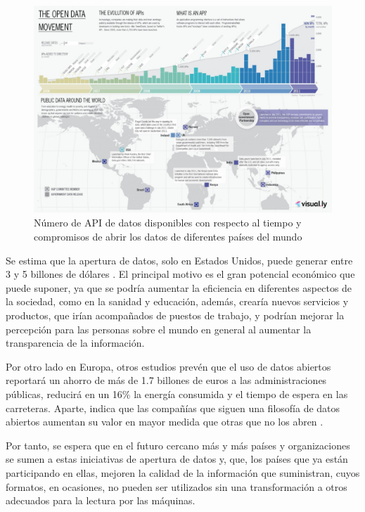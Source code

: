 \begin{figure}[htp!]
	\centering
	\caption{Número de API de datos disponibles con respecto al tiempo y compromisos de abrir los datos de diferentes países del mundo \cite{graphdata}}
	\label{fig:opendata}
	\vspace{10pt}
	\includegraphics[scale=0.3]{graphics/opendata}
\end{figure}



Se estima que la apertura de datos, solo en Estados Unidos, puede generar entre 3 y 5 billones de dólares \cite{revenueOpenData}. El principal motivo es el gran potencial económico que puede suponer, ya que se podría aumentar la eficiencia en diferentes aspectos de la sociedad, como en la sanidad y educación, además, crearía nuevos servicios y productos, que irían acompañados de puestos de trabajo, y podrían mejorar la percepción para las personas sobre el mundo en general al aumentar la transparencia de la información.

Por otro lado en Europa, otros estudios prevén que el uso de datos abiertos reportará un ahorro de más de 1.7 billones de euros a las administraciones públicas, reducirá en un 16\% la energía consumida y el tiempo de espera en las carreteras. Aparte, indica que las compañías que siguen una filosofía de datos abiertos aumentan su valor en mayor medida que otras que no los abren \cite{valueOpenData}.

Por tanto, se espera que en el futuro cercano más y más países y organizaciones se sumen a estas iniciativas de apertura de datos y, que, los países que ya están participando en ellas, mejoren la calidad de la información que suministran, cuyos formatos, en ocasiones, no pueden ser utilizados sin una transformación a otros adecuados para la lectura por las máquinas.

